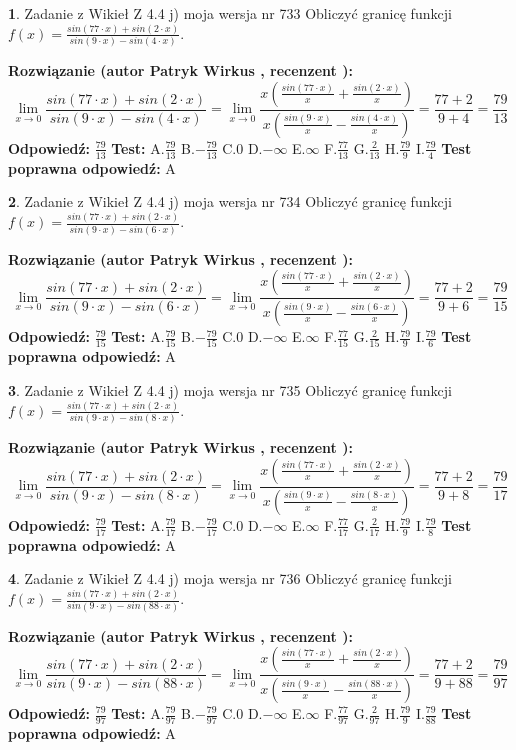 \documentclass[12pt, a4paper]{article}
\theoremstyle{definition} %
\newtheorem{zad}{}
\newcommand{\zadStart}[1]{\begin{zad}#1\newline}
\newcommand{\zadStop}{\end{zad}}
\newcommand{\rozwStart}[2]{\noindent \textbf{Rozwiązanie (autor #1 , recenzent #2): }\newline}
\newcommand{\rozwStop}{\newline}
\newcommand{\odpStart}{\noindent \textbf{Odpowiedź:}\newline}
\newcommand{\odpStop}{\newline}
\newcommand{\testStart}{\noindent \textbf{Test:}\newline}
\newcommand{\testStop}{\newline}
\newcommand{\kluczStart}{\noindent \textbf{Test poprawna odpowiedź:}\newline}
\newcommand{\kluczStop}{\newline}
\begin{document}
\zadStart{Zadanie z Wikieł Z 4.4 j) moja wersja nr 733}
Obliczyć granicę funkcji $f(x)=\frac{sin(77\cdot x) +sin(2\cdot x)}{sin(9\cdot x) -sin(4\cdot x)}$.
\zadStop
\rozwStart{Patryk Wirkus}{}
$$\lim\limits_{x\to 0}\frac{sin(77\cdot x) +sin(2\cdot x)}{sin(9\cdot x) -sin(4\cdot x)}=\lim\limits_{x\to 0}\frac{x(\frac{sin(77\cdot x)}{x}+\frac{sin(2\cdot x)}{x})}{x(\frac{sin(9\cdot x)}{x}-\frac{sin(4\cdot x)}{x})}=\frac{77+2}{9+4} = \frac{79}{13}$$
\rozwStop
\odpStart
$\frac{79}{13}$
\odpStop
\testStart
A.$\frac{79}{13}$
B.$-\frac{79}{13}$
C.$0$
D.$-\infty$
E.$\infty$
F.$\frac{77}{13}$
G.$\frac{2}{13}$
H.$\frac{79}{9}$
I.$\frac{79}{4}$
\testStop
\kluczStart
A
\kluczStop



\zadStart{Zadanie z Wikieł Z 4.4 j) moja wersja nr 734}
Obliczyć granicę funkcji $f(x)=\frac{sin(77\cdot x) +sin(2\cdot x)}{sin(9\cdot x) -sin(6\cdot x)}$.
\zadStop
\rozwStart{Patryk Wirkus}{}
$$\lim\limits_{x\to 0}\frac{sin(77\cdot x) +sin(2\cdot x)}{sin(9\cdot x) -sin(6\cdot x)}=\lim\limits_{x\to 0}\frac{x(\frac{sin(77\cdot x)}{x}+\frac{sin(2\cdot x)}{x})}{x(\frac{sin(9\cdot x)}{x}-\frac{sin(6\cdot x)}{x})}=\frac{77+2}{9+6} = \frac{79}{15}$$
\rozwStop
\odpStart
$\frac{79}{15}$
\odpStop
\testStart
A.$\frac{79}{15}$
B.$-\frac{79}{15}$
C.$0$
D.$-\infty$
E.$\infty$
F.$\frac{77}{15}$
G.$\frac{2}{15}$
H.$\frac{79}{9}$
I.$\frac{79}{6}$
\testStop
\kluczStart
A
\kluczStop



\zadStart{Zadanie z Wikieł Z 4.4 j) moja wersja nr 735}
Obliczyć granicę funkcji $f(x)=\frac{sin(77\cdot x) +sin(2\cdot x)}{sin(9\cdot x) -sin(8\cdot x)}$.
\zadStop
\rozwStart{Patryk Wirkus}{}
$$\lim\limits_{x\to 0}\frac{sin(77\cdot x) +sin(2\cdot x)}{sin(9\cdot x) -sin(8\cdot x)}=\lim\limits_{x\to 0}\frac{x(\frac{sin(77\cdot x)}{x}+\frac{sin(2\cdot x)}{x})}{x(\frac{sin(9\cdot x)}{x}-\frac{sin(8\cdot x)}{x})}=\frac{77+2}{9+8} = \frac{79}{17}$$
\rozwStop
\odpStart
$\frac{79}{17}$
\odpStop
\testStart
A.$\frac{79}{17}$
B.$-\frac{79}{17}$
C.$0$
D.$-\infty$
E.$\infty$
F.$\frac{77}{17}$
G.$\frac{2}{17}$
H.$\frac{79}{9}$
I.$\frac{79}{8}$
\testStop
\kluczStart
A
\kluczStop



\zadStart{Zadanie z Wikieł Z 4.4 j) moja wersja nr 736}
Obliczyć granicę funkcji $f(x)=\frac{sin(77\cdot x) +sin(2\cdot x)}{sin(9\cdot x) -sin(88\cdot x)}$.
\zadStop
\rozwStart{Patryk Wirkus}{}
$$\lim\limits_{x\to 0}\frac{sin(77\cdot x) +sin(2\cdot x)}{sin(9\cdot x) -sin(88\cdot x)}=\lim\limits_{x\to 0}\frac{x(\frac{sin(77\cdot x)}{x}+\frac{sin(2\cdot x)}{x})}{x(\frac{sin(9\cdot x)}{x}-\frac{sin(88\cdot x)}{x})}=\frac{77+2}{9+88} = \frac{79}{97}$$
\rozwStop
\odpStart
$\frac{79}{97}$
\odpStop
\testStart
A.$\frac{79}{97}$
B.$-\frac{79}{97}$
C.$0$
D.$-\infty$
E.$\infty$
F.$\frac{77}{97}$
G.$\frac{2}{97}$
H.$\frac{79}{9}$
I.$\frac{79}{88}$
\testStop
\kluczStart
A
\kluczStop
\end{document}
